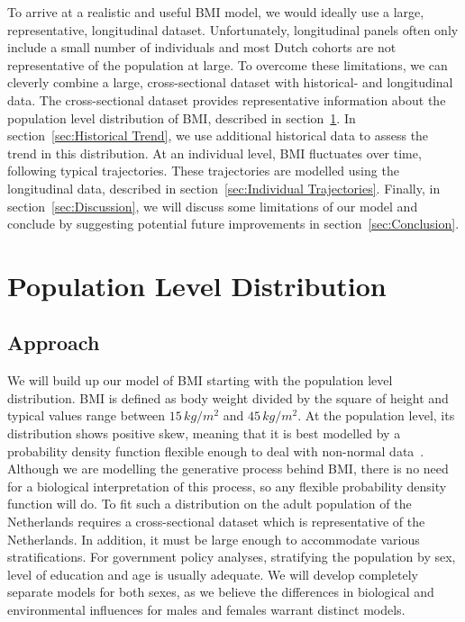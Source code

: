 \documentclass{imammb}
\numberwithin{equation}{section}
\begin{document}
To arrive at a realistic and useful BMI model, we would ideally use a large, representative, longitudinal dataset. Unfortunately, longitudinal panels often only include a small number of individuals and most Dutch cohorts are not representative of the population at large. To overcome these limitations, we can cleverly combine a large, cross-sectional dataset with historical- and longitudinal data. The cross-sectional dataset provides representative information about the population level distribution of BMI, described in section~\ref{sec:Population Level Distribution}. In section~\ref{sec:Historical Trend}, we use additional historical data to assess the trend in this distribution. At an individual level, BMI fluctuates over time, following typical trajectories. These trajectories are modelled using the longitudinal data, described in section~\ref{sec:Individual Trajectories}. Finally, in section~\ref{sec:Discussion}, we will discuss some limitations of our model and conclude by suggesting potential future improvements in section~\ref{sec:Conclusion}.

\section{Population Level Distribution}
\label{sec:Population Level Distribution}

\subsection{Approach}
\label{sec:Population Level Distribution/Approach}

We will build up our model of BMI starting with the population level distribution. BMI is defined as body weight divided by the square of height and typical values range between $15 \, kg / m^2$ and $45 \, kg / m^2$. At the population level, its distribution shows positive skew, meaning that it is best modelled by a probability density function flexible enough to deal with non-normal data~\citep{Majer2013}. Although we are modelling the generative process behind BMI, there is no need for a biological interpretation of this process, so any flexible probability density function will do. To fit such a distribution on the adult population of the Netherlands requires a cross-sectional dataset which is representative of the Netherlands. In addition, it must be large enough to accommodate various stratifications. For government policy analyses, stratifying the population by sex, level of education and age is usually adequate. We will develop completely separate models for both sexes, as we believe the differences in biological and environmental influences for males and females warrant distinct models.
\end{document}
